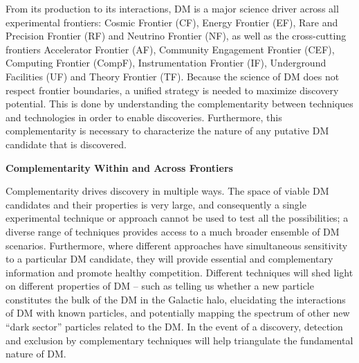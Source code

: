 \documentclass[nofootinbib]{article}
\begin{document}
From its production to its interactions, DM is a major science driver across all experimental frontiers: Cosmic Frontier (CF), Energy Frontier (EF), Rare and Precision Frontier (RF) and Neutrino Frontier (NF), as well as the cross-cutting frontiers Accelerator Frontier (AF), Community Engagement Frontier (CEF), Computing Frontier (CompF), Instrumentation Frontier (IF), Underground Facilities (UF) and Theory Frontier (TF). Because the science of DM does not respect frontier boundaries, a unified strategy is needed to maximize discovery potential. This is done by understanding the complementarity between techniques and technologies in order to enable discoveries. Furthermore, this complementarity is necessary to characterize the nature of any putative DM candidate that is discovered.

\noindent
{\bf Complementarity Within and Across Frontiers}

Complementarity drives discovery in multiple ways. The space of viable DM candidates and their properties is very large, and consequently a single experimental technique or approach cannot be used to test all the possibilities; a diverse range of techniques provides access to a much broader ensemble of DM scenarios. Furthermore, where different approaches have simultaneous sensitivity to a particular DM candidate, they will provide essential and complementary information and promote healthy competition. Different techniques will shed light on different properties of DM -- such as telling us whether a new particle constitutes the bulk of the DM in the Galactic halo, elucidating the interactions of DM with known particles, and potentially mapping the spectrum of other new ``dark sector'' particles related to the DM. In the event of a discovery, detection and exclusion by complementary techniques will help triangulate the fundamental nature of DM.


\end{document}
